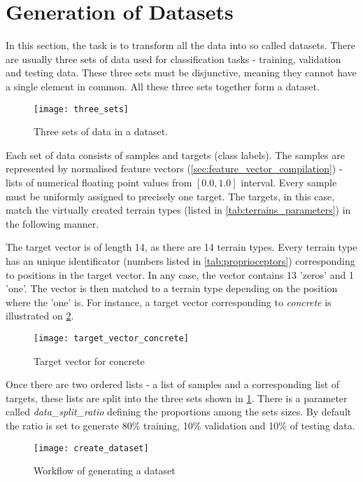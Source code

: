 \newpage
\section{Generation of Datasets} \label{sec:dataset_creation}
In this section, the task is to transform all the data into so called datasets. There are usually three sets of data used for classification tasks - training, validation and testing data. These three sets must be disjunctive, meaning they cannot have a single element in common. All these three sets together form a dataset.

\begin{figure}[H]
  \centering
  \texttt{[image: three\_sets]}
  \caption{Three sets of data in a dataset.}
  \label{img:three_sets}
\end{figure}

Each set of data consists of samples and targets (class labels). The samples are represented by normalised feature vectors (\cref{sec:feature_vector_compilation}) - lists of numerical floating point values from $ [0.0, 1.0] $ interval. Every sample must be uniformly assigned to precisely one target. The targets, in this case, match the virtually created terrain types (listed in \cref{tab:terrains_parameters}) in the following manner.

The target vector is of length 14, as there are 14 terrain types. Every terrain type has an unique identificator (numbers listed in \cref{tab:proprioceptors}) corresponding to positions in the target vector. In any case, the vector contains 13 'zeros' and 1 'one'. The vector is then matched to a terrain type depending on the position where the 'one' is. For instance, a target vector corresponding to \textit{concrete} is illustrated on \cref{img:target_vector_concrete}.

\begin{figure}[H]
  \centering
  \texttt{[image: target\_vector\_concrete]}
  \caption{Target vector for concrete}
  \label{img:target_vector_concrete}
\end{figure}

Once there are two ordered lists - a list of samples and a corresponding list of targets, these lists are split into the three sets shown in \cref{img:three_sets}. There is a parameter called \textit{data\_split\_ratio} defining the proportions among the sets sizes. By default the ratio is set to generate 80\% training, 10\% validation and 10\% of testing data.

\begin{figure}[H]
  \centering
  \texttt{[image: create\_dataset]}
  \caption{Workflow of generating a dataset}
  \label{img:create_dataset}
\end{figure}


